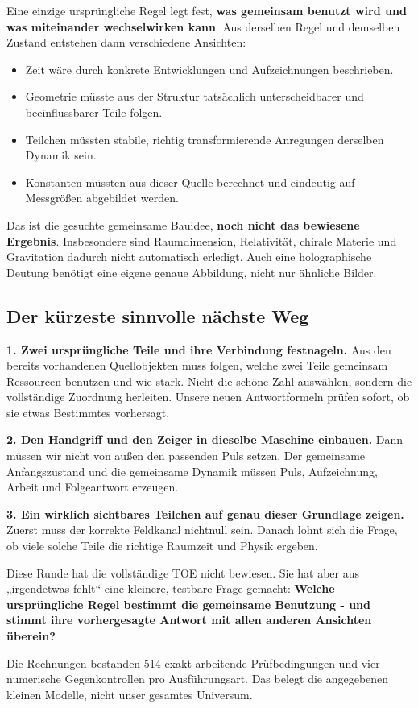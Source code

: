 \documentclass[
  ngerman,
  10pt,
  a4paper,
]{article}
\providecommand{\tightlist}{%
  \setlength{\itemsep}{0pt}\setlength{\parskip}{0pt}}
\begin{document}
Eine einzige ursprüngliche Regel legt fest, \textbf{was gemeinsam
benutzt wird und was miteinander wechselwirken kann}. Aus derselben
Regel und demselben Zustand entstehen dann verschiedene Ansichten:

\begin{itemize}
\tightlist
\item
  Zeit wäre durch konkrete Entwicklungen und Aufzeichnungen beschrieben.
\item
  Geometrie müsste aus der Struktur tatsächlich unterscheidbarer und
  beeinflussbarer Teile folgen.
\item
  Teilchen müssten stabile, richtig transformierende Anregungen
  derselben Dynamik sein.
\item
  Konstanten müssten aus dieser Quelle berechnet und eindeutig auf
  Messgrößen abgebildet werden.
\end{itemize}

Das ist die gesuchte gemeinsame Bauidee, \textbf{noch nicht das
bewiesene Ergebnis}. Insbesondere sind Raumdimension, Relativität,
chirale Materie und Gravitation dadurch nicht automatisch erledigt. Auch
eine holographische Deutung benötigt eine eigene genaue Abbildung, nicht
nur ähnliche Bilder.

\subsection{Der kürzeste sinnvolle nächste
Weg}\label{der-kuxfcrzeste-sinnvolle-nuxe4chste-weg}

\textbf{1. Zwei ursprüngliche Teile und ihre Verbindung festnageln.} Aus
den bereits vorhandenen Quellobjekten muss folgen, welche zwei Teile
gemeinsam Ressourcen benutzen und wie stark. Nicht die schöne Zahl
auswählen, sondern die vollständige Zuordnung herleiten. Unsere neuen
Antwortformeln prüfen sofort, ob sie etwas Bestimmtes vorhersagt.

\textbf{2. Den Handgriff und den Zeiger in dieselbe Maschine einbauen.}
Dann müssen wir nicht von außen den passenden Puls setzen. Der
gemeinsame Anfangszustand und die gemeinsame Dynamik müssen Puls,
Aufzeichnung, Arbeit und Folgeantwort erzeugen.

\textbf{3. Ein wirklich sichtbares Teilchen auf genau dieser Grundlage
zeigen.} Zuerst muss der korrekte Feldkanal nichtnull sein. Danach lohnt
sich die Frage, ob viele solche Teile die richtige Raumzeit und Physik
ergeben.

Diese Runde hat die vollständige TOE nicht bewiesen. Sie hat aber aus
„irgendetwas fehlt`` eine kleinere, testbare Frage gemacht:
\textbf{Welche ursprüngliche Regel bestimmt die gemeinsame Benutzung -
und stimmt ihre vorhergesagte Antwort mit allen anderen Ansichten
überein?}

Die Rechnungen bestanden 514 exakt arbeitende Prüfbedingungen und vier
numerische Gegenkontrollen pro Ausführungsart. Das belegt die
angegebenen kleinen Modelle, nicht unser gesamtes Universum.
\end{document}
